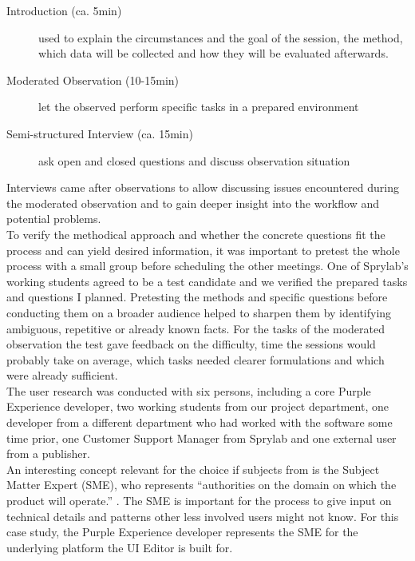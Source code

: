 \begin{description}
  \item [Introduction (ca. 5min)] used to explain the circumstances and the goal of the session, the method, which data will be collected and how they will be evaluated afterwards.
  \item [Moderated Observation (10-15min)] let the observed perform specific tasks in a prepared environment
  \item [Semi-structured Interview (ca. 15min)] ask open and closed questions and discuss observation situation
\end{description}
Interviews came after observations to allow discussing issues encountered during the moderated observation and to gain deeper insight into the workflow and potential problems.
\\
To verify the methodical approach and whether the concrete questions fit the process and can yield desired information, it was important to pretest the whole process with a small group before scheduling the other meetings. One of Sprylab's working students agreed to be a test candidate and we verified the prepared tasks and questions I planned.
Pretesting the methods and specific questions before conducting them on a broader audience helped to sharpen them by identifying ambiguous, repetitive or already known facts.
For the tasks of the moderated observation the test gave feedback on the difficulty, time the sessions would probably take on average, which tasks needed clearer formulations and which were already sufficient.
\\
The user research was conducted with six persons, including a core Purple Experience developer, two working students from our project department, one developer from a different department who had worked with the software some time prior, one Customer Support Manager from Sprylab and one external user from a publisher.
\\
An interesting concept relevant for the choice if subjects from \cite[p. 41]{AboutFace:2014ys} is the Subject Matter Expert (SME), who represents ``authorities on the domain on which the product will operate.'' \cite[p. 41]{AboutFace:2014ys}. The SME is important for the process to give input on technical details and patterns other less involved users might not know. For this case study, the Purple Experience developer represents the SME for the underlying platform the UI Editor is built for.


